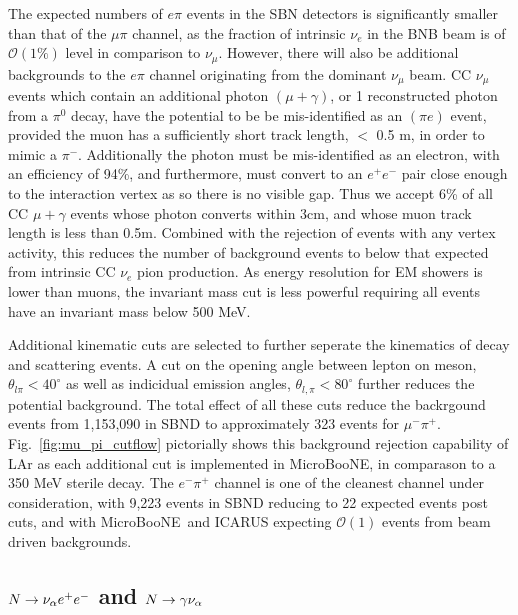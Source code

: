 \documentclass[11pt, a4paper]{article}
\newcommand{\reffig}[1]{Fig.~\ref{#1}}
\def\muboone{MicroBooNE}
\def\ster{\ensuremath N}
\begin{document}
The expected numbers of $e \pi$ events in the SBN detectors is significantly
smaller than that of the $\mu \pi$ channel, as the fraction of intrinsic
$\nu_e$ in the BNB beam is of $\mathcal{O}(1\%)$ level in comparison to
$\nu_\mu$. However, there will also be additional backgrounds to the $e \pi$
channel originating from the dominant $\nu_\mu$ beam. CC $\nu_\mu$ events which
contain an additional photon $(\mu+\gamma)$, or 1 reconstructed photon from a
$\pi^0$ decay, have the potential to be be mis-identified as an $(\pi e)$
event, provided the muon has a sufficiently short track length, $<$ 0.5 m, in
order to mimic a $\pi^-$. Additionally the photon must be mis-identified as an
electron, with an efficiency of 94\%, and furthermore, must convert to an
$e^+e^-$ pair close enough to the interaction vertex as so there is no visible
gap. Thus we accept 6\% of all CC $\mu+\gamma$ events whose photon converts
within 3cm, and whose muon track length is less than 0.5m. Combined with the
rejection of events with any vertex activity, this reduces the number of
background events to below that expected from intrinsic CC $\nu_e$ pion
production. As energy resolution for EM showers is lower than muons, the
invariant mass cut is less powerful requiring all events have an invariant mass
below 500 MeV. 

Additional kinematic cuts are selected to further seperate the kinematics of decay and scattering events. A cut
on the opening angle between lepton on meson, $\theta_{l \pi} < 40^\circ$ as well as indicidual
emission angles, $\theta_{l,\pi} < 80^\circ$ further reduces the potential background. The total effect of all these cuts reduce the backrgound events 
from 1,153,090 in SBND to approximately 323 events for $\mu^- \pi^+$.
\reffig{fig:mu_pi_cutflow} pictorially shows this background rejection capability of LAr as
each additional cut is implemented in \muboone, in comparason to a 350 MeV
sterile decay. The $e^- \pi^+$ channel is one of the cleanest channel under
consideration, with 9,223 events in SBND reducing to 22 expected events post
cuts, and with \muboone\ and ICARUS expecting $\mathcal{O}(1)$ events from
beam driven backgrounds.


\subsection{$\ster \rightarrow \nu_\alpha e^+ e^-$ and $\ster \rightarrow \gamma \nu_\alpha$ }
\end{document}
